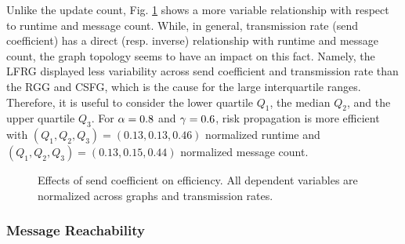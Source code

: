 Unlike the update count, Fig. \ref{fig:efficiency} shows a more variable relationship with respect to runtime and message count. While, in general, transmission rate (send coefficient) has a direct (resp. inverse) relationship with runtime and message count, the graph topology seems to have an impact on this fact. Namely, the LFRG displayed less variability across send coefficient and transmission rate than the RGG and CSFG, which is the cause for the large interquartile ranges. Therefore, it is useful to consider the lower quartile $Q_1$, the median $Q_2$, and the upper quartile $Q_3$. For $\alpha = 0.8 $ and $\gamma = 0.6$, risk propagation is more efficient with $(Q_{1}, Q_{2}, Q_{3}) = (0.13, 0.13, 0.46)$ normalized runtime and $(Q_{1}, Q_{2}, Q_{3}) = (0.13, 0.15, 0.44)$ normalized message count.

\begin{figure}[htbp]
\centering
{}
\caption[Effects of send coefficient on efficiency]{Effects of send coefficient on efficiency. All dependent variables are normalized across graphs and transmission rates.}
\label{fig:efficiency}
\end{figure}

\subsubsection{Message Reachability}

